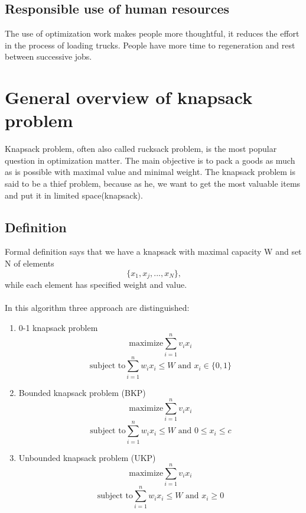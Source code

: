 \documentclass[conference,compsoc]{IEEEtran}
\begin{document}
\subsection{Responsible use of human resources}
The use of optimization work makes people more thoughtful, it reduces the effort in the process of loading trucks. People have more time to regeneration and rest between successive jobs.

\section{General overview of knapsack problem}
Knapsack problem, often also called rucksack problem, is the most popular question in optimization matter. The main objective is to pack a goods as much as is possible with maximal value and minimal weight. The knapsack problem is said to be a thief problem, because as he, we want to get the most valuable items and put it in limited space(knapsack).

\subsection{Definition}
Formal definition says that we have a knapsack with maximal capacity W and set N of elements 
$$ \{x_1,x_j,...,x_N\} \textrm{,}$$
while each element has specified weight and value.\\\\
In this algorithm three approach are distinguished:
\begin{enumerate}
  \item 0-1 knapsack problem\\
  $$ \textrm{maximize}\sum_{i=1}^{n}v_{i}x_{i} $$ 
$$ \textrm{subject to} \sum_{i=1}^{n}w_{i}x_{i} \leqslant W \textrm{ and } x_{i} \in \{0,1\} $$
  \item Bounded knapsack problem (BKP)\\
    $$ \textrm{maximize}\sum_{i=1}^{n}v_{i}x_{i} $$ 
$$ \textrm{subject to} \sum_{i=1}^{n}w_{i}x_{i} \leqslant W \textrm{ and } 0 \leqslant x_{i} \leqslant c $$
  \item Unbounded knapsack problem (UKP)\\
      $$ \textrm{maximize}\sum_{i=1}^{n}v_{i}x_{i} $$ 
$$ \textrm{subject to} \sum_{i=1}^{n}w_{i}x_{i} \leqslant W \textrm{ and }  x_{i} \geqslant 0 $$
\end{enumerate}
\end{document}
